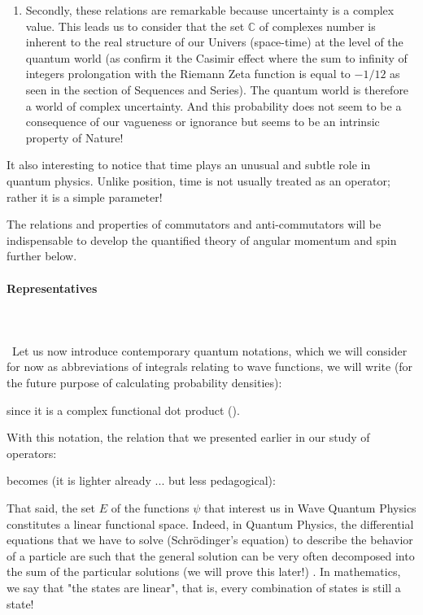 \begin{enumerate}
		\item Secondly, these relations are remarkable because uncertainty is a complex value. This leads us to consider that the set $\mathbb{C}$ of complexes number is inherent to the real structure of our Univers (space-time) at the level of the quantum world (as confirm it the Casimir effect where the sum to infinity of integers prolongation with the Riemann Zeta function is equal to $-1/12$ as seen in the section of Sequences and Series). The quantum world is therefore a world of complex uncertainty. And this probability does not seem to be a consequence of our vagueness or ignorance but seems to be an intrinsic property of Nature!
	\end{enumerate}
	
	It also interesting to notice that time plays an unusual and subtle role in quantum physics. Unlike position, time is not usually treated as an operator; rather it is a simple parameter!
	\begin{tcolorbox}[title=Remark,colframe=black,arc=10pt]
	The relations and properties of commutators and anti-commutators will be indispensable to develop the quantified theory of angular momentum and spin further below.
	\end{tcolorbox}
	
	\paragraph{Representatives}\mbox{}\\\\\
	Let us now introduce contemporary quantum notations, which we will consider for now as abbreviations of integrals relating to wave functions, we will write (for the future purpose of calculating probability densities):
	
	since it is a complex functional dot product ().

	With this notation, the relation that we presented earlier in our study of operators:
	
	becomes (it is lighter already ... but less pedagogical):
	
	That said, the set $E$ of the functions $\psi$ that interest us in Wave Quantum Physics constitutes a linear functional space. Indeed, in Quantum Physics, the differential equations that we have to solve (Schrödinger's equation) to describe the behavior of a particle are such that the general solution can be very often decomposed into the sum of the particular solutions (we will prove this later!) . In mathematics, we say that "the states are linear", that is, every combination of states is still a state!
	
